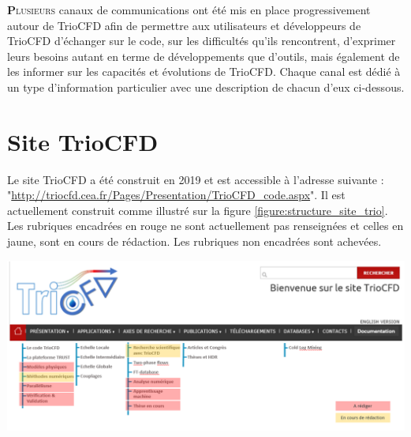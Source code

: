 
\lettrine[lines=2,slope=0pt,nindent=4pt]{\textbf{P}}{lusieurs} canaux de communications ont \'et\'e mis en place progressivement autour de TrioCFD
afin de permettre aux utilisateurs et d\'eveloppeurs de TrioCFD d'\'echanger sur le code, sur les difficult\'es qu'ils rencontrent, d'exprimer
leurs besoins autant en terme de d\'eveloppements que d'outils, mais \'egalement de les informer sur les capacit\'es et \'evolutions de
TrioCFD. Chaque canal est d\'edi\'e \`a un type d'information particulier avec une description de chacun d'eux ci-dessous.

\chapter{\label{chapitre:site}Site TrioCFD}

Le site TrioCFD a \'et\'e construit en 2019 et est accessible \`a l'adresse suivante :
"\url{http://triocfd.cea.fr/Pages/Presentation/TrioCFD_code.aspx}". Il est actuellement construit comme illustr\'e sur
la figure \ref{figure:structure_site_trio}. Les rubriques encadr\'ees en rouge ne sont actuellement pas renseign\'ees
et celles en jaune, sont en cours de r\'edaction. Les rubriques non encadr\'ees sont achev\'ees.\newline

\begin{center}\includegraphics[width=14cm]{pictures/site_Trio.png}\end{center}
\begin{center}\end{center}

